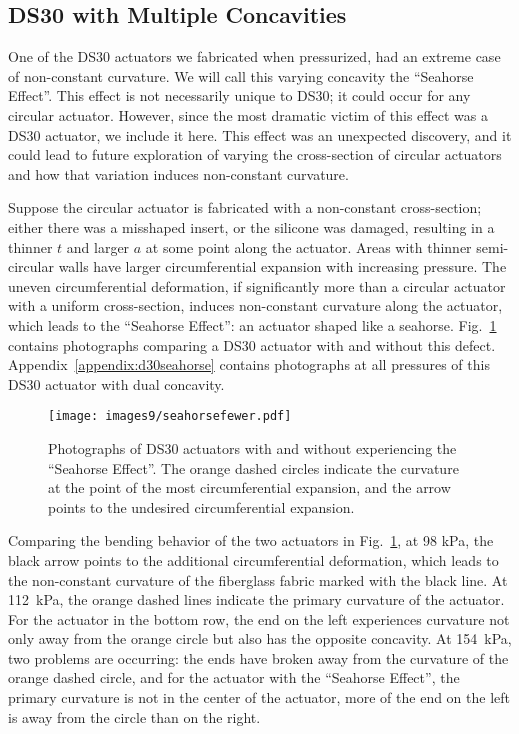 \clearpage
\subsection{DS30 with Multiple Concavities}

One of the DS30 actuators we fabricated when pressurized, had an extreme case of non-constant curvature. We will call this varying concavity the ``Seahorse Effect''. This effect is not necessarily unique to DS30; it could occur for any circular actuator. However, since the most dramatic victim of this effect was a DS30 actuator, we include it here. This effect was an unexpected discovery, and it could lead to future exploration of varying the cross-section of circular actuators and how that variation induces non-constant curvature. 

Suppose the circular actuator is fabricated with a non-constant cross-section; either there was a misshaped insert, or the silicone was damaged, resulting in a thinner $t$ and larger $a$ at some point along the actuator. Areas with thinner semi-circular walls have larger circumferential expansion with increasing pressure. The uneven circumferential deformation, if significantly more than a circular actuator with a uniform cross-section, induces non-constant curvature along the actuator, which leads to the ``Seahorse Effect'': an actuator shaped like a seahorse. Fig.~\ref{fig:seahorsefewer} contains photographs comparing a DS30 actuator with and without this defect. Appendix~\ref{appendix:d30seahorse} contains photographs at all pressures of this DS30 actuator with dual concavity. 

\begin{figure}[!ht]
    \centering
     \texttt{[image: images9/seahorsefewer.pdf]}
    \caption{Photographs of DS30 actuators with and without experiencing the ``Seahorse Effect''. The orange dashed circles indicate the curvature at the point of the most circumferential expansion, and the arrow points to the undesired circumferential expansion.}
    \label{fig:seahorsefewer}
\end{figure}

Comparing the bending behavior of the two actuators in Fig.~\ref{fig:seahorsefewer}, at 98 kPa, the black arrow points to the additional circumferential deformation, which leads to the non-constant curvature of the fiberglass fabric marked with the black line. At 112~kPa, the orange dashed lines indicate the primary curvature of the actuator. For the actuator in the bottom row, the end on the left experiences curvature not only away from the orange circle but also has the opposite concavity. At 154~kPa, two problems are occurring: the ends have broken away from the curvature of the orange dashed circle, and for the actuator with the ``Seahorse Effect'', the primary curvature is not in the center of the actuator, more of the end on the left is away from the circle than on the right. 


